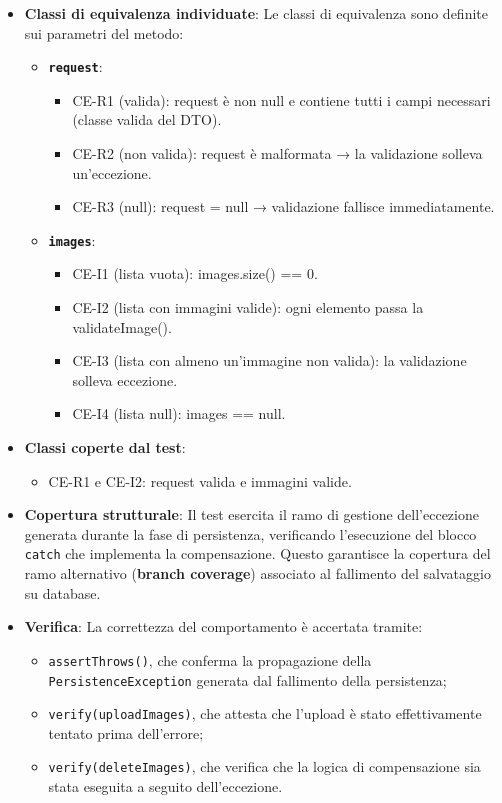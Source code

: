 \documentclass{book}
\begin{document}
\begin{itemize}

\item \textbf{Classi di equivalenza individuate}: 
Le classi di equivalenza sono definite sui parametri del metodo:
\begin{itemize}
    \item \textbf{\texttt{request}}:
    \begin{itemize}
        \item CE-R1 (valida): request è non null e contiene tutti i campi necessari (classe valida del DTO).
        \item CE-R2 (non valida): request è malformata → la validazione solleva un’eccezione.
        \item CE-R3 (null): request = null → validazione fallisce immediatamente.
    \end{itemize}
    \item \textbf{\texttt{images}}:
    \begin{itemize}
        \item CE-I1 (lista vuota): images.size() == 0.
        \item CE-I2 (lista con immagini valide): ogni elemento passa la validateImage().
        \item CE-I3 (lista con almeno un'immagine non valida): la validazione solleva eccezione.
        \item CE-I4 (lista null): images == null.
    \end{itemize}
\end{itemize}
\item \textbf{Classi coperte dal test}:
\begin{itemize}
    \item CE-R1 e CE-I2: request valida e immagini valide.
\end{itemize}

\item \textbf{Copertura strutturale}:
Il test esercita il ramo di gestione dell’eccezione generata durante la fase di persistenza, verificando l’esecuzione del blocco \texttt{catch} che implementa la compensazione. Questo garantisce la copertura del ramo alternativo (\textbf{branch coverage}) associato al fallimento del salvataggio su database.

\item \textbf{Verifica}:
La correttezza del comportamento è accertata tramite:

\begin{itemize}
\item \texttt{assertThrows()}, che conferma la propagazione della \texttt{PersistenceException} generata dal fallimento della persistenza;
\item \texttt{verify(uploadImages)}, che attesta che l’upload è stato effettivamente tentato prima dell’errore;
\item \texttt{verify(deleteImages)}, che verifica che la logica di compensazione sia stata eseguita a seguito dell’eccezione.
\end{itemize}


\end{itemize}
\end{document}
